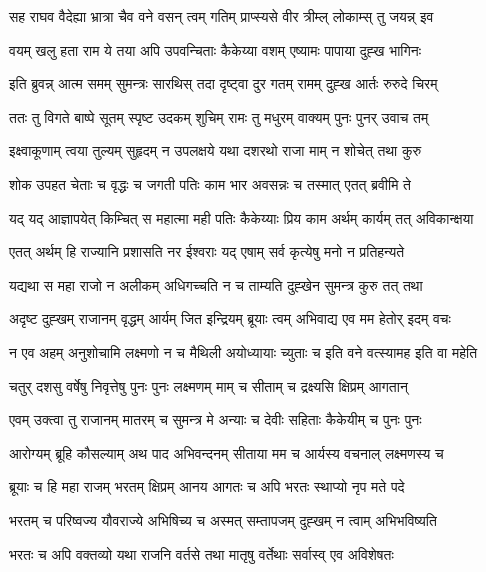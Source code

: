 \twolineshloka
{सह राघव वैदेह्या भ्रात्रा चैव वने वसन्}
{त्वम् गतिम् प्राप्स्यसे वीर त्रीम्ल् लोकाम्स् तु जयन्न् इव} %

\twolineshloka
{वयम् खलु हता राम ये तया अपि उपवन्चिताः}
{कैकेय्या वशम् एष्यामः पापाया दुह्ख भागिनः} %

\twolineshloka
{इति ब्रुवन्न् आत्म समम् सुमन्त्रः सारथिस् तदा}
{दृष्ट्वा दुर गतम् रामम् दुह्ख आर्तः रुरुदे चिरम्} %

\twolineshloka
{ततः तु विगते बाष्पे सूतम् स्पृष्ट उदकम् शुचिम्}
{रामः तु मधुरम् वाक्यम् पुनः पुनर् उवाच तम्} %

\twolineshloka
{इक्ष्वाकूणाम् त्वया तुल्यम् सुहृदम् न उपलक्षये}
{यथा दशरथो राजा माम् न शोचेत् तथा कुरु} %

\twolineshloka
{शोक उपहत चेताः च वृद्धः च जगती पतिः}
{काम भार अवसन्नः च तस्मात् एतत् ब्रवीमि ते} %

\twolineshloka
{यद् यद् आज्ञापयेत् किम्चित् स महात्मा मही पतिः}
{कैकेय्याः प्रिय काम अर्थम् कार्यम् तत् अविकान्क्षया} %

\twolineshloka
{एतत् अर्थम् हि राज्यानि प्रशासति नर ईश्वराः}
{यद् एषाम् सर्व कृत्येषु मनो न प्रतिहन्यते} %

\twolineshloka
{यद्यथा स महा राजो न अलीकम् अधिगच्चति}
{न च ताम्यति दुह्खेन सुमन्त्र कुरु तत् तथा} %

\twolineshloka
{अदृष्ट दुह्खम् राजानम् वृद्धम् आर्यम् जित इन्द्रियम्}
{ब्रूयाः त्वम् अभिवाद्य एव मम हेतोर् इदम् वचः} %

\twolineshloka
{न एव अहम् अनुशोचामि लक्ष्मणो न च मैथिली}
{अयोध्यायाः च्युताः च इति वने वत्स्यामह इति वा महेति} %

\twolineshloka
{चतुर् दशसु वर्षेषु निवृत्तेषु पुनः पुनः}
{लक्ष्मणम् माम् च सीताम् च द्रक्ष्यसि क्षिप्रम् आगतान्} %

\twolineshloka
{एवम् उक्त्वा तु राजानम् मातरम् च सुमन्त्र मे}
{अन्याः च देवीः सहिताः कैकेयीम् च पुनः पुनः} %

\twolineshloka
{आरोग्यम् ब्रूहि कौसल्याम् अथ पाद अभिवन्दनम्}
{सीताया मम च आर्यस्य वचनाल् लक्ष्मणस्य च} %

\twolineshloka
{ब्रूयाः च हि महा राजम् भरतम् क्षिप्रम् आनय}
{आगतः च अपि भरतः स्थाप्यो नृप मते पदे} %

\twolineshloka
{भरतम् च परिष्वज्य यौवराज्ये अभिषिच्य च}
{अस्मत् सम्तापजम् दुह्खम् न त्वाम् अभिभविष्यति} %

\twolineshloka
{भरतः च अपि वक्तव्यो यथा राजनि वर्तसे}
{तथा मातृषु वर्तेथाः सर्वास्व् एव अविशेषतः} %

